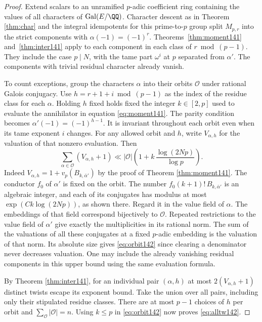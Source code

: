 \documentclass[a4paper,11pt]{article}
\theoremstyle{definition}
\theoremstyle{remark}
\numberwithin{equation}{section}
\begin{document}
\begin{proof}
Extend scalars to an unramified \(p\)-adic coefficient ring
containing the values of all characters of
\(\operatorname{Gal}(E/\QQ)\). Character descent as in
Theorem \ref{thm:char}
and the integral idempotents for this prime-to-\(p\) group
split \(M_{p,r}\) into the strict components with
\(\alpha(-1)=(-1)^r\). Theorems~\ref{thm:moment141} and~\ref{thm:inter141}
apply to each component in each class of \(r\bmod(p-1)\).
They include the case \(p\mid N\), with the tame part
\(\omega^i\) at \(p\) separated from \(\alpha'\).
The components with trivial residual character already vanish.

To count exceptions, group the characters \(\alpha\) into
their orbits \(\mathcal O\) under rational Galois conjugacy.
Use \(h=r+1+i\bmod(p-1)\) as the index of the residue class
for each \(\alpha\). Holding \(h\) fixed holds fixed the integer
\(k\in[2,p]\) used to evaluate the annihilator in equation \ref{eq:moment141}. The parity condition becomes \(\alpha'(-1)=(-1)^{h-1}\).
It is invariant throughout each orbit even when its tame
exponent \(i\) changes. For any allowed orbit and \(h\), write
\(V_{\alpha,h}\) for the valuation of that nonzero evaluation.
Then
\begin{equation}
 \sum_{\alpha\in\mathcal O}(V_{\alpha,h}+1)
       \ll |\mathcal O|\left(1+
                    k\,\frac{\log(2Np)}{\log p}\right).
 \label{eq:orbit142}
\end{equation}
Indeed \(V_{\alpha,h}=1+v_p(B_{k,\bar\alpha'})\) by the proof
of Theorem \ref{thm:moment141}. The conductor \(f_0\) of \(\alpha'\)
is fixed on the orbit. The number
\(f_0(k+1)!\,B_{k,\bar\alpha'}\) is an algebraic integer, and
each of its conjugates has modulus at most
\(\exp(Ck\log(2Np))\), as shown there. Regard it in the value
field of \(\alpha\). The embeddings of that field correspond
bijectively to \(\mathcal O\). Repeated restrictions to the
value field of \(\alpha'\) give exactly the multiplicities
in its rational norm. The sum of the valuations of all these
conjugates at a fixed \(p\)-adic embedding is the valuation
of that norm. Its absolute size gives \eqref{eq:orbit142}
since clearing a denominator never decreases valuation.
One may include the already vanishing residual components in
this upper bound using the same evaluation formula.

By Theorem \ref{thm:inter141}, for an individual pair
\((\alpha,h)\) at most \(2(V_{\alpha,h}+1)\) distinct
twists escape its exponent bound. Take the union over all
pairs, including only their stipulated residue classes.
There are at most \(p-1\) choices of \(h\) per orbit and
\(\sum_{\mathcal O}|\mathcal O|=n\). Using \(k\le p\) in
\eqref{eq:orbit142} now proves \eqref{eq:alltw142}.


\end{proof}
\end{document}
